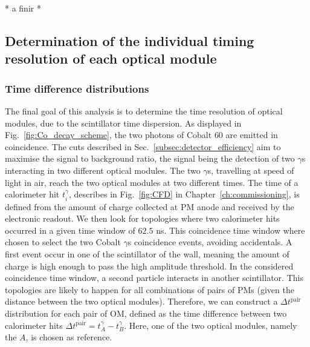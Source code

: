 




* a finir *

\subsection{Determination of the individual timing resolution of each optical module}


\subsubsection*{Time difference distributions}

The final goal of this analysis is to determine the time resolution of optical modules, due to the scintillator time dispersion.
As displayed in Fig.~\ref{fig:Co_decay_scheme}, the two photons of Cobalt $60$ are emitted in coincidence.
The cuts described in Sec.~\ref{subsec:detector_efficiency} aim to maximise the signal to background ratio, the signal being the detection of two $\gamma$s interacting in two different optical modules.
The two $\gamma$s, travelling at speed of light in air, reach the two optical modules at two different times.
The time of a calorimeter hit $t^{\gamma}_{i}$, describes in Fig.~\ref{fig:CFD} in Chapter~\ref{ch:commissioning}, is defined from the amount of charge collected at PM anode and received by the electronic readout.
We then look for topologies where two calorimeter hits occurred in a given time window of $62.5$ ns.
This coincidence time window where chosen to select the two Cobalt $\gamma$s coincidence events, avoiding accidentals.
A first event occur in one of the scintillator of the wall, meaning the amount of charge is high enough to pass the high amplitude threshold.
In the considered coincidence time window, a second particle interacts in another scintillator.
This topologies are likely to happen for all combinations of pairs of PMs (given the distance between the two optical modules).
Therefore, we can construct a $\Delta t^{\text{pair}}$ distribution for each pair of OM, defined as the time difference between two calorimeter hits $\Delta t^{\text{pair}} = t^{\gamma}_{A} - t^{\gamma}_{B}$.
Here, one of the two optical modules, namely the $A$, is chosen as reference.

